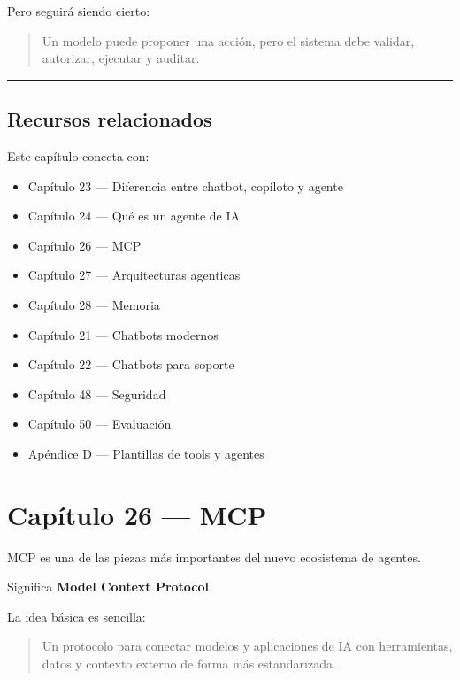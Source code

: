 Pero seguirá siendo cierto:

\begin{quote}
Un modelo puede proponer una acción, pero el sistema debe validar,
autorizar, ejecutar y auditar.
\end{quote}

\begin{center}\rule{0.5\linewidth}{0.5pt}\end{center}

\section{Recursos relacionados}\label{recursos-relacionados-24}

Este capítulo conecta con:

\begin{itemize}
\tightlist
\item
  Capítulo 23 --- Diferencia entre chatbot, copiloto y agente
\item
  Capítulo 24 --- Qué es un agente de IA
\item
  Capítulo 26 --- MCP
\item
  Capítulo 27 --- Arquitecturas agenticas
\item
  Capítulo 28 --- Memoria
\item
  Capítulo 21 --- Chatbots modernos
\item
  Capítulo 22 --- Chatbots para soporte
\item
  Capítulo 48 --- Seguridad
\item
  Capítulo 50 --- Evaluación
\item
  Apéndice D --- Plantillas de tools y agentes
\end{itemize}

\newpage

\chapter{Capítulo 26 --- MCP}\label{capuxedtulo-26-mcp}

MCP es una de las piezas más importantes del nuevo ecosistema de
agentes.

Significa \textbf{Model Context Protocol}.

La idea básica es sencilla:

\begin{quote}
Un protocolo para conectar modelos y aplicaciones de IA con
herramientas, datos y contexto externo de forma más estandarizada.
\end{quote}


